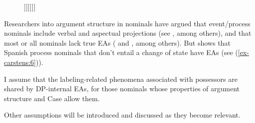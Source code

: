 \documentclass[output=paper
,modfonts
,nonflat]{langsci/langscibook}
\begin{document}
\begin{figure}[!h]
\begin{exe}
	 \ex \label{ex-carstens:5}
		\begin{forest} 
		[DP, for tree={fit=rectangle}
		[F]	
		[(FP)
		[F]
		[NumP
		[Num]
		[(FP)
		[F]
		[\textit{n}P(/PossP)
		[{DP/KP\\\textit{possesor/agent}}]
		[\textit{n'}
		[\textit{n}]
		[{NP\\\textit{head noun}\\(\textit{possessum or argument-}\\ \textit{taking nominal})}]]]]]]]		
		\end{forest}
\end{exe} \vspace{-0.8cm}
\end{figure}

Researchers into argument structure in nominals have argued that event/process nominals include verbal and aspectual projections (see \citealt{Borer1993,Hazout1995}, among others), and that most or all nominals lack true EAs (\citealt{Picallo1991} and \citealt{Alexiadou2001}, among others). But \citet{Lopez2018} shows that Spanish process nominals that don’t entail a change of state have EAs (see (\ref{ex-carstens:6})).

\newpage
{}
I assume that the labeling-related phenomena associated with possessors are shared by DP-internal EAs, for those nominals whose properties of argument structure and Case allow them. 

Other assumptions will be introduced and discussed as they become relevant.
\end{document}

